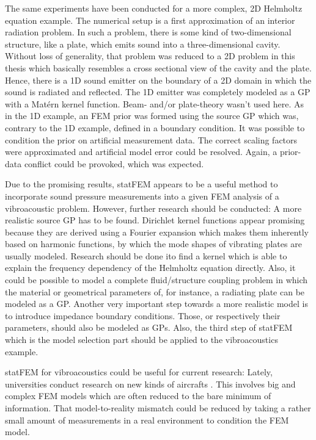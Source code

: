 \documentclass[%
  a4paper,oneside,%
  11pt,%
  smallchapters,
  style=printdev,
  extramargin,
  green,%
  rgb, <cmyk>
  ]{tubsbook}
\begin{document}
The same experiments have been conducted for a more complex, 2D Helmholtz equation example. The numerical setup is a first approximation of an interior radiation problem. In such a problem, there is some kind of two-dimensional structure, like a plate, which emits sound into a three-dimensional cavity. Without loss of generality, that problem was reduced to a 2D problem in this thesis which basically resembles a cross sectional view of the cavity and the plate. Hence, there is a 1D sound emitter on the boundary of a 2D domain in which the sound is radiated and reflected. The 1D emitter was completely modeled as a GP with a Mat\'ern kernel function.  Beam- and/or plate-theory wasn't used here.  As in the 1D example, an FEM prior was formed using the source GP which was, contrary to the 1D example, defined in a boundary condition. It was possible to condition the prior on artificial measurement data. The correct scaling factors were approximated and artificial model error could be resolved. Again, a prior-data conflict could be provoked, which was expected. 

Due to the promising results, statFEM appears to be a useful method to incorporate sound pressure measurements into a given FEM analysis of a vibroacoustic problem. However, further research should be conducted: A more realistic source GP has to be found. Dirichlet kernel functions appear promising \cite{Jeppsson} because they are derived using a Fourier expansion which makes them inherently based on harmonic functions, by which the mode shapes of vibrating plates are usually modeled. Research should be done ito find a kernel which is able to explain the frequency dependency of the Helmholtz equation directly. Also, it could be possible to model a complete fluid/structure coupling problem in which the material or geometrical parameters of, for instance, a radiating plate can be modeled as a GP. Another very important step towards a more realistic model is to introduce impedance boundary conditions. Those, or respectively their parameters, should also be modeled as GPs. Also, the third step of statFEM which is the model selection part should be applied to the vibroacoustics example.

statFEM for vibroacoustics could be useful for current research: Lately, universities conduct research on new kinds of aircrafts \cite{Blech2020}. This involves big and complex FEM models which are often reduced to the bare minimum of information. That model-to-reality mismatch could be reduced by taking a rather small amount of measurements in a real environment to condition the FEM model. 
\end{document}
